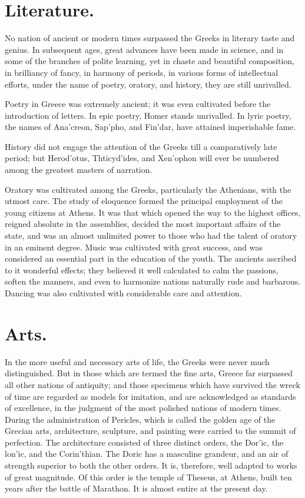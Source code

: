 \documentclass[openany,a4paper]{memoir}
\begin{document}
\section{Literature.}

No nation of ancient or modern times surpassed the Greeks in literary taste and genius. In subsequent ages, great advances have been made in science, and in 
some of the branches of polite learning, yet in chaste and 
beautiful composition, in brilliancy of fancy, in harmony of 
periods, in various forms of intellectual efforts, under the 
name of poetry, oratory, and history, they are still unrivalled. 

Poetry in Greece was extremely ancient; it was even cultivated before the introduction of letters. In epic poetry, 
Homer stands unrivalled. In lyric poetry, the names of 
Ana'creon, Sap'pho, and Fin'dar, have attained imperishable fame. 

History did not engage the attention of the Greeks till a 
comparatively late period; but Herod'otus, Thticyd'ides, and 
Xen'ophon will ever be numbered among the greatest masters of narration. 

Oratory was cultivated among the Greeks, particularly the 
Athenians, with the utmost care. The study of eloquence 
formed the principal employment of the young citizens at 
Athens. It was that which opened the way to the highest 
offices, reigned absolute in the assemblies, decided the most 
important affairs of the state, and was an almost unlimited 
power to those who had the talent of oratory in an eminent 
degree. Music was cultivated with great success, and was 
considered an essential part in the education of the youth. 
The ancients ascribed to it wonderful effects; they believed 
it well calculated to calm the passions, soften the manners, 
and even to harmonize nations naturally rude and barbarous. 
Dancing was also cultivated with considerable care and attention. 

\section{Arts.}

In the more useful and necessary arts of life, the 
Greeks were never much distinguished. But in those which 
are termed the fine arts, Greece far surpassed all other nations 
of antiquity; and those specimens which have survived the 
wreck of time are regarded as models for imitation, and are 
acknowledged as standards of excellence, in the judgment of 
the most polished nations of modern times. During the administration of Pericles, which is called the golden age of 
the Grecian arts, architecture, sculpture, and painting were 
carried to the summit of perfection. The architecture consisted of three distinct orders, the Dor'ic, the lon'ic, and 
the Corin'thian. The Doric has a masculine grandeur, and 
an air of strength superior to both the other orders. It is, 
therefore, well adapted to works of great magnitude. Of 
this order is the temple of Theseus, at Athens, built ten 
years after the battle of Marathon. It is almost entire at 
the present day. 
\end{document}
